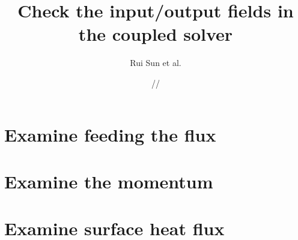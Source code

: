 \documentclass[11pt]{report}
\title{\textbf{Check the input/output fields in the coupled solver}}
\author{Rui Sun et al.}
\date{\oldstylenums{07}/\oldstylenums{01}/\oldstylenums{2018}}
\begin{document}
\maketitle

\section{Examine feeding the flux}

 
\section{Examine the momentum}



\section{Examine surface heat flux}







\end{document}
